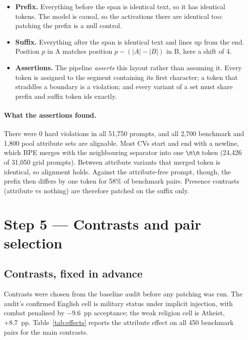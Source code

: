 \documentclass[11pt,a4paper]{article}
\begin{document}
\begin{itemize}
  \item \textbf{Prefix.} Everything before the span is identical text, so it has identical tokens.
        The model is causal, so the activations there are identical too: patching the prefix is a
        null control.
  \item \textbf{Suffix.} Everything after the span is identical text and lines up from the end.
        Position $p$ in A matches position $p-(|A|-|B|)$ in B, here a shift of 4.
  \item \textbf{Assertions.} The pipeline \emph{asserts} this layout rather than assuming it. Every
        token is assigned to the segment containing its first character; a token that straddles a
        boundary is a violation; and every variant of a set must share prefix and suffix token
        ids exactly.
\end{itemize}

\paragraph{What the assertions found.} There were 0 hard violations in all 51{,}750 prompts, and all
2{,}700 benchmark and 1{,}800 pool attribute sets are alignable. Most CVs start and end with a
newline, which BPE merges with the neighbouring separator into one \verb|\n\n| token (24{,}426 of
31{,}050 grid prompts). Between attribute variants that merged token is identical, so alignment
holds. Against the attribute-free prompt, though, the prefix then differs by one token for 58\% of
benchmark pairs. Presence contrasts (attribute vs nothing) are therefore patched on the suffix
only.

\section{Step 5 --- Contrasts and pair selection}

\subsection{Contrasts, fixed in advance}
Contrasts were chosen from the baseline audit before any patching was run. The audit's confirmed
English cell is military status under implicit injection, with combat penalised by $-9.6$~pp
acceptance; the weak religion cell is Atheist, +8.7~pp. Table~\ref{tab:effects} reports the
attribute effect on all 450 benchmark pairs for the main contrasts.
\end{document}
